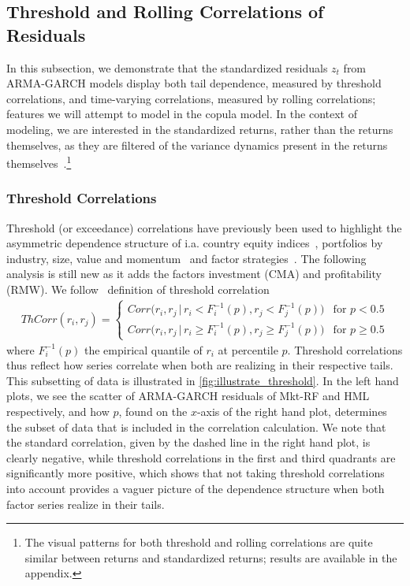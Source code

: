 
\subsection{Threshold and Rolling Correlations of Residuals} %

In this subsection, we demonstrate that the standardized residuals ${z_t}$ from ARMA-GARCH models display both tail dependence, measured by threshold correlations, and time-varying correlations, measured by rolling correlations; features we will attempt to model in the copula model. In the context of modeling, we are interested in the standardized returns, rather than the returns themselves, as they are filtered of the variance dynamics present in the returns themselves~\autocite{ChristoffersenLanglois2013}.\footnote{The visual patterns for both threshold and rolling correlations are quite similar between returns and standardized returns; results are available in the appendix.}

\subsubsection{Threshold Correlations}

Threshold (or exceedance) correlations have previously been used to highlight the asymmetric dependence structure of i.a. country equity indices~\autocite{LonginSolnik2001}, portfolios by industry, size, value and momentum~\autocite{AngChen2002} and factor strategies~\autocite{ChristoffersenLanglois2013}. The following analysis is still new as it adds the factors investment (CMA) and profitability (RMW). We follow~\textcite{ChristoffersenLanglois2013} definition of threshold correlation
\begin{align}
    ThCorr(r_i, r_j) = 
    \begin{cases} 
        Corr\Big(r_i, r_j \,|\, r_i < F_i^{-1}(p), r_j < F_j^{-1}(p)\Big)  & \text{for } p < 0.5 \\
        Corr\Big(r_i, r_j \,|\, r_i \geq F_i^{-1}(p), r_j \geq F_j^{-1}(p)\Big)  & \text{for } p \geq 0.5
    \end{cases}
\end{align}
where $F_i^{-1}(p)$ the empirical quantile of $r_i$ at percentile $p$. Threshold correlations thus reflect how series correlate when both are realizing in their respective tails. This subsetting of data is illustrated in \autoref{fig:illustrate_threshold}. In the left hand plots, we see the scatter of ARMA-GARCH residuals of Mkt-RF and HML respectively, and how $p$, found on the $x$-axis of the right hand plot, determines the subset of data that is included in the correlation calculation. We note that the standard correlation, given by the dashed line in the right hand plot, is clearly negative, while threshold correlations in the first and third quadrants are significantly more positive, which shows that not taking threshold correlations into account provides a vaguer picture of the dependence structure when both factor series realize in their tails.

